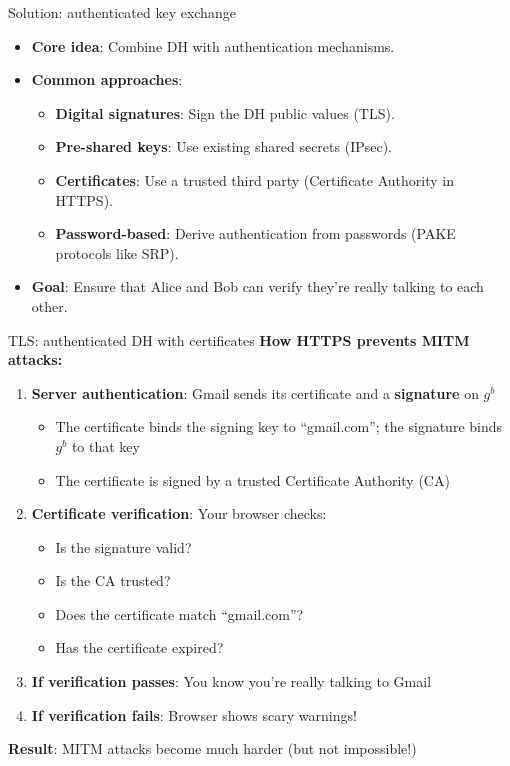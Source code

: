 \ifdefined\PRESENTATION\else\PassOptionsToClass{handout}{beamer}\fi\documentclass[aspectratio=169, lualatex]{beamer}
\begin{document}
\begin{frame}{Solution: authenticated key exchange}
	\begin{itemize}[<+->]
		\item \textbf{Core idea}: Combine DH with authentication mechanisms.
		\item \textbf{Common approaches}:
		      \begin{itemize}
			      \item \textbf{Digital signatures}: Sign the DH public values (TLS).
			      \item \textbf{Pre-shared keys}: Use existing shared secrets (IPsec).
			      \item \textbf{Certificates}: Use a trusted third party (Certificate Authority in HTTPS).
			      \item \textbf{Password-based}: Derive authentication from passwords (PAKE protocols like SRP).
		      \end{itemize}
		\item \textbf{Goal}: Ensure that Alice and Bob can verify they're really talking to each other.
	\end{itemize}
\end{frame}

\begin{frame}{TLS: authenticated DH with certificates}
	\textbf{How HTTPS prevents MITM attacks:}
	\begin{enumerate}[<+->]
		\item \textbf{Server authentication}: Gmail sends its certificate and a \textbf{signature} on $g^b$
		      \begin{itemize}
			      \item The certificate binds the signing key to ``gmail.com''; the signature binds $g^b$ to that key
			      \item The certificate is signed by a trusted Certificate Authority (CA)
		      \end{itemize}
		\item \textbf{Certificate verification}: Your browser checks:
		      \begin{itemize}
			      \item Is the signature valid?
			      \item Is the CA trusted?
			      \item Does the certificate match ``gmail.com''?
			      \item Has the certificate expired?
		      \end{itemize}
		\item \textbf{If verification passes}: You know you're really talking to Gmail
		\item \textbf{If verification fails}: Browser shows scary warnings!
	\end{enumerate}
	\textbf{Result}: MITM attacks become much harder (but not impossible!)
\end{frame}
\end{document}
